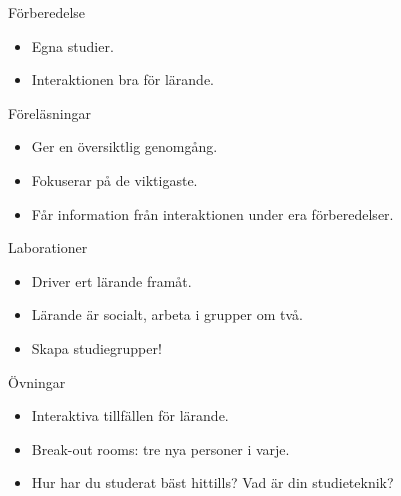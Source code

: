 \begin{frame}
  \begin{block}{Förberedelse}
    \begin{itemize}
      \item Egna studier.
      \item Interaktionen bra för lärande.
    \end{itemize}
  \end{block}

  \pause
  
  \begin{block}{Föreläsningar}
    \begin{itemize}
      \item Ger en översiktlig genomgång.
      \item Fokuserar på de viktigaste.
      \item Får information från interaktionen under era förberedelser.
    \end{itemize}
  \end{block}
\end{frame}

\begin{frame}
  \begin{block}{Laborationer}
    \begin{itemize}
      \item Driver ert lärande framåt.
      \item Lärande är socialt, arbeta i grupper om två.
    \end{itemize}
  \end{block}

  \pause

  \begin{remark}
    \begin{itemize}
      \item Skapa studiegrupper!
    \end{itemize}
  \end{remark}

  \pause

  \begin{block}{Övningar}
    \begin{itemize}
      \item Interaktiva tillfällen för lärande.
    \end{itemize}
  \end{block}
\end{frame}

\begin{frame}
  \begin{exercise}
    \begin{itemize}
      \item Break-out rooms: tre nya personer i varje.
      \item Hur har du studerat bäst hittills? Vad är din studieteknik?
    \end{itemize}
  \end{exercise}
\end{frame}


